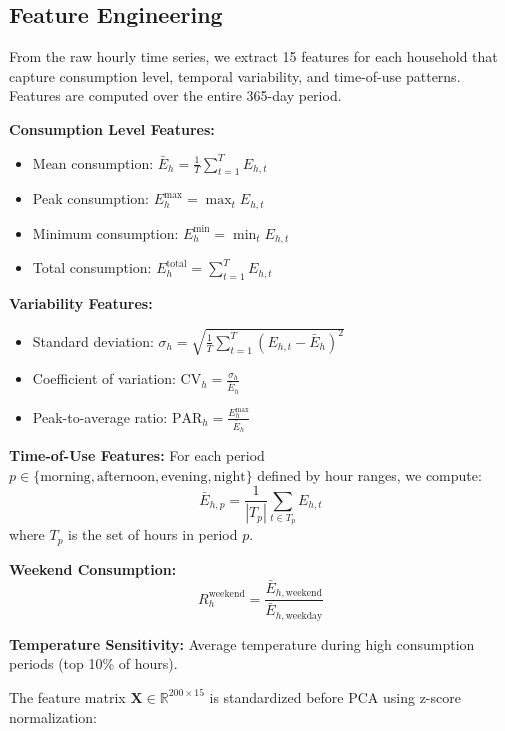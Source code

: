 \documentclass[11pt]{article}
\begin{document}
\subsection{Feature Engineering}

From the raw hourly time series, we extract 15 features for each household that capture consumption level, temporal variability, and time-of-use patterns. Features are computed over the entire 365-day period.

\textbf{Consumption Level Features:}
\begin{itemize}
    \item Mean consumption: $\bar{E}_h = \frac{1}{T} \sum_{t=1}^{T} E_{h,t}$
    \item Peak consumption: $E_h^{\max} = \max_t E_{h,t}$
    \item Minimum consumption: $E_h^{\min} = \min_t E_{h,t}$
    \item Total consumption: $E_h^{\text{total}} = \sum_{t=1}^{T} E_{h,t}$
\end{itemize}

\textbf{Variability Features:}
\begin{itemize}
    \item Standard deviation: $\sigma_h = \sqrt{\frac{1}{T} \sum_{t=1}^{T} (E_{h,t} - \bar{E}_h)^2}$
    \item Coefficient of variation: $\text{CV}_h = \frac{\sigma_h}{\bar{E}_h}$
    \item Peak-to-average ratio: $\text{PAR}_h = \frac{E_h^{\max}}{\bar{E}_h}$
\end{itemize}

\textbf{Time-of-Use Features:}
For each period $p \in \{\text{morning}, \text{afternoon}, \text{evening}, \text{night}\}$ defined by hour ranges, we compute:
\begin{equation}
\bar{E}_{h,p} = \frac{1}{|T_p|} \sum_{t \in T_p} E_{h,t}
\end{equation}
where $T_p$ is the set of hours in period $p$.

\textbf{Weekend Consumption:}
\begin{equation}
R_h^{\text{weekend}} = \frac{\bar{E}_{h,\text{weekend}}}{\bar{E}_{h,\text{weekday}}}
\end{equation}

\textbf{Temperature Sensitivity:}
Average temperature during high consumption periods (top 10\% of hours).

The feature matrix $\mathbf{X} \in \mathbb{R}^{200 \times 15}$ is standardized before PCA using z-score normalization:
\end{document}

